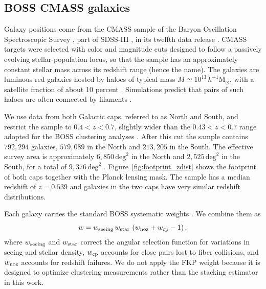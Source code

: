 \documentclass[preprint]{aastex701}
\begin{document}
\subsection{BOSS CMASS galaxies}
\label{sec:data_cmass}

Galaxy positions come from the CMASS sample of the Baryon Oscillation
Spectroscopic Survey \citep[BOSS;][]{Dawson2013}, part of SDSS-III
\citep{Eisenstein2011}, in its twelfth data release
\citep{Alam2015, Reid2016}. CMASS targets were selected with color and
magnitude cuts designed to follow a passively evolving stellar-population
locus, so that the sample has an approximately constant stellar mass across
its redshift range (hence the name). The galaxies are luminous red galaxies
hosted by haloes of typical mass $M\simeq10^{13}\,h^{-1}\mathrm{M}_{\odot}$,
with a satellite fraction of about 10 percent \citep{White2011}. 
Simulations predict that pairs of such haloes are often connected by filaments \citep{Colberg2005}.

We use data from both Galactic caps, referred to as North and South, and restrict the sample to $0.4<z<0.7$, slightly wider than the $0.43<z<0.7$ range
adopted for the BOSS clustering analyses \citep{Reid2016}.
After this cut the sample contains $792{,}294$ galaxies, $579{,}089$ in the
North and $213{,}205$ in the South.  
The effective survey area is approximately $6{,}850\,\mathrm{deg}^{2}$ in the
North and $2{,}525\,\mathrm{deg}^{2}$ in the South, for a total of
$9{,}376\,\mathrm{deg}^{2}$ \citep{Reid2016}. %
Figure~\ref{fig:footprint_zdist} shows the footprint of both caps together
with the Planck lensing mask. The sample has a median redshift of $z=0.539$
and galaxies in the two caps have very similar redshift distributions.

Each galaxy carries the standard BOSS systematic weights
\citep{Ross2012, Reid2016}. We combine them as
\begin{equation}
  w = w_{\rm seeing}\, w_{\rm star}\,
      \left(w_{\rm noz} + w_{\rm cp} - 1\right),
  \label{eq:weights}
\end{equation}
where $w_{\rm seeing}$ and $w_{\rm star}$ correct the angular selection
function for variations in seeing and stellar density, $w_{\rm cp}$ accounts
for close pairs lost to fiber collisions, and $w_{\rm noz}$ accounts for
redshift failures. We do not apply the FKP weight because it is designed to
optimize clustering measurements rather than the stacking estimator in this work.
\end{document}
